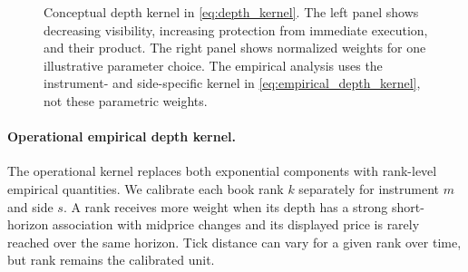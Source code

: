 \documentclass[11pt]{article}
\begin{document}
\begin{figure}[htbp]
{%
    }
    \caption{Conceptual depth kernel in \cref{eq:depth_kernel}. The left panel shows decreasing visibility, increasing
    protection from immediate execution, and their product. The right panel shows normalized weights for one illustrative
    parameter choice. The empirical analysis uses the instrument- and side-specific kernel in
    \cref{eq:empirical_depth_kernel}, not these parametric weights.}
    \label{fig:depth_kernel_behavior}
\end{figure}

\paragraph{Operational empirical depth kernel.}
The operational kernel replaces both exponential components with rank-level empirical quantities. We calibrate each book
rank $k$ separately for instrument $m$ and side $s$. A rank receives more weight when its depth has a strong short-horizon
association with midprice changes and its displayed price is rarely reached over the same horizon. Tick distance can vary
for a given rank over time, but rank remains the calibrated unit.
\end{document}
